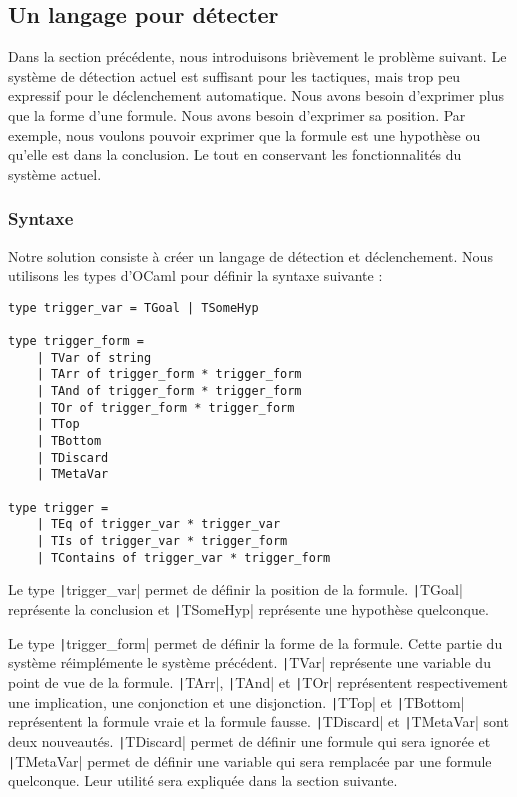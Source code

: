 \documentclass[titlepage]{article}
\begin{document}
\subsection{Un langage pour détecter}
Dans la section précédente, nous introduisons brièvement le problème suivant. Le système de détection actuel est suffisant pour les tactiques, mais trop peu expressif pour le déclenchement automatique. Nous avons besoin d'exprimer plus que la forme d'une formule. Nous avons besoin d'exprimer sa position. Par exemple, nous voulons pouvoir exprimer que la formule est une hypothèse ou qu'elle est dans la conclusion. Le tout en conservant les fonctionnalités du système actuel.

\subsubsection{Syntaxe}
Notre solution consiste à créer un langage de détection et déclenchement. Nous utilisons les types d'OCaml pour définir la syntaxe suivante :
\begin{verbatim}
type trigger_var = TGoal | TSomeHyp

type trigger_form =
    | TVar of string
    | TArr of trigger_form * trigger_form
    | TAnd of trigger_form * trigger_form
    | TOr of trigger_form * trigger_form
    | TTop
    | TBottom
    | TDiscard
    | TMetaVar

type trigger =
    | TEq of trigger_var * trigger_var
    | TIs of trigger_var * trigger_form
    | TContains of trigger_var * trigger_form
\end{verbatim}

Le type \texttt|trigger_var| permet de définir la position de la formule. \texttt|TGoal| représente la conclusion et \texttt|TSomeHyp| représente une hypothèse quelconque.

Le type \texttt|trigger_form| permet de définir la forme de la formule. Cette partie du système réimplémente le système précédent. \texttt|TVar| représente une variable du point de vue de la formule. \texttt|TArr|, \texttt|TAnd| et \texttt|TOr| représentent respectivement une implication, une conjonction et une disjonction. \texttt|TTop| et \texttt|TBottom| représentent la formule vraie et la formule fausse. \texttt|TDiscard| et \texttt|TMetaVar| sont deux nouveautés. \texttt|TDiscard| permet de définir une formule qui sera ignorée et \texttt|TMetaVar| permet de définir une variable qui sera remplacée par une formule quelconque. Leur utilité sera expliquée dans la section suivante.
\end{document}

